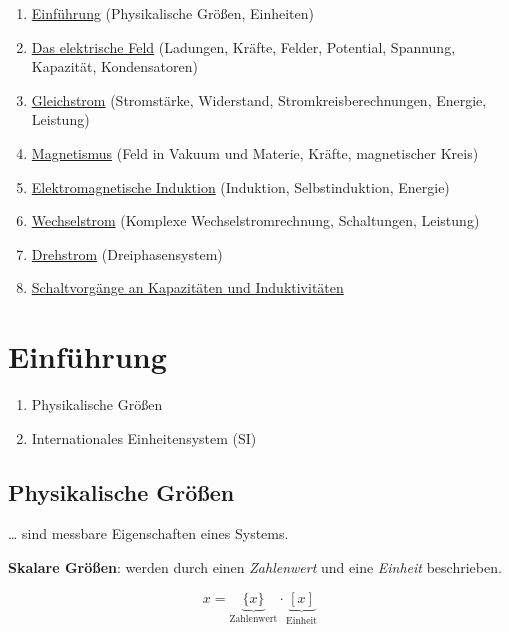 \documentclass[
  11pt,
]{article}
\providecommand{\tightlist}{%
  \setlength{\itemsep}{0pt}\setlength{\parskip}{0pt}}
\begin{document}
\begin{enumerate}
\def\labelenumi{\arabic{enumi}.}
\tightlist
\item
  \hyperref[einfuxfchrung]{Einführung} (Physikalische Größen, Einheiten)
\item
  \hyperref[das-elektrische-feld]{Das elektrische Feld} (Ladungen,
  Kräfte, Felder, Potential, Spannung, Kapazität, Kondensatoren)
\item
  \hyperref[gleichstrom]{Gleichstrom} (Stromstärke, Widerstand,
  Stromkreisberechnungen, Energie, Leistung)
\item
  \hyperref[magnetismus]{Magnetismus} (Feld in Vakuum und Materie,
  Kräfte, magnetischer Kreis)
\item
  \hyperref[elektromagnetische-induktion]{Elektromagnetische Induktion}
  (Induktion, Selbstinduktion, Energie)
\item
  \hyperref[wechselstrom]{Wechselstrom} (Komplexe Wechselstromrechnung,
  Schaltungen, Leistung)
\item
  \hyperref[drehstrom]{Drehstrom} (Dreiphasensystem)
\item
  \hyperref[schaltvorguxe4nge-an-kapazituxe4ten-und-induktivituxe4ten]{Schaltvorgänge
  an Kapazitäten und Induktivitäten}
\end{enumerate}

\section{Einführung}\label{einfuxfchrung}

\begin{enumerate}
\def\labelenumi{\arabic{enumi}.}
\tightlist
\item
  Physikalische Größen
\item
  Internationales Einheitensystem (SI)
\end{enumerate}

\subsection{Physikalische Größen}\label{physikalische-gruxf6uxdfen}

\ldots{} sind messbare Eigenschaften eines Systems.

\textbf{Skalare Größen}: werden durch einen \emph{Zahlenwert} und eine
\emph{Einheit} beschrieben.

\[x = \underbrace{\lbrace x \rbrace}_{\text{Zahlenwert}} \cdot \underbrace{[x]}_{\text{Einheit}}\]
\end{document}
